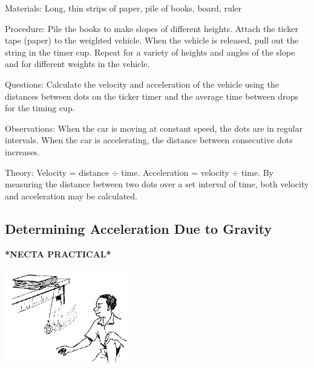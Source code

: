 \begin{multicols}{2}
\begin{description*}
\item[Materials:]{Long, thin strips of paper, pile of books, board, ruler}
\item[Procedure:]{Pile the books to make slopes of different heights. Attach the ticker tape (paper) to the weighted vehicle. When the vehicle is released, pull out the string in the timer cup. Repeat for a variety of heights and angles of the slope and for different weights in the vehicle.}
\item[Questions:]{Calculate the velocity and acceleration of the vehicle using the distances between dots on the ticker timer and the average time between drops for the timing cup.}
\item[Observations:]{When the car is moving at constant speed, the dots are in regular intervals. When the car is accelerating, the distance between consecutive dots increases.}
\item[Theory:]{Velocity = distance $\div$ time. Acceleration = velocity $\div$ time. By measuring the distance between two dots over a set interval of time, both velocity and acceleration may be calculated.}
\end{description*}

\columnbreak

\subsection{Determining Acceleration Due to Gravity}    
\textbf{*NECTA PRACTICAL*}

\begin{center}
\includegraphics[width=0.4\textwidth]{./img/source/pendulum-gravity.png}
\end{center}


\end{multicols}
